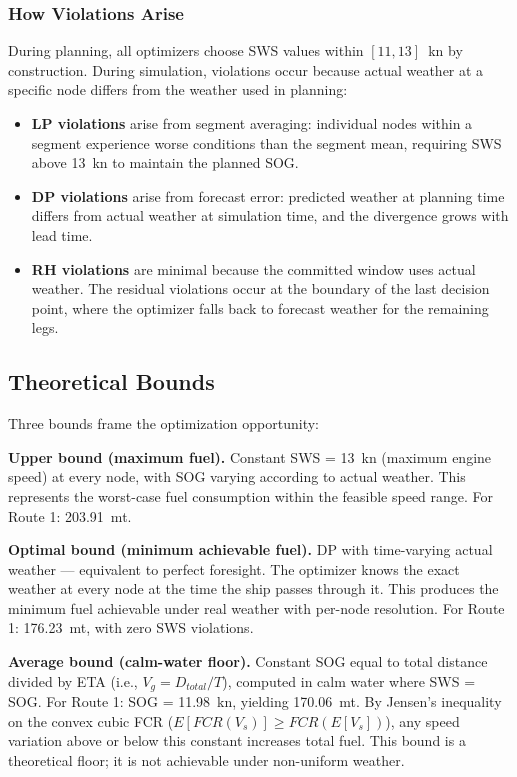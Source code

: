 \documentclass[review]{elsarticle}
\begin{document}
\subsubsection{How Violations Arise}

During planning, all optimizers choose SWS values within $[11, 13]$~kn by construction. During simulation, violations occur because actual weather at a specific node differs from the weather used in planning:

\begin{itemize}
    \item \textbf{LP violations} arise from segment averaging: individual nodes within a segment experience worse conditions than the segment mean, requiring SWS above 13~kn to maintain the planned SOG.
    \item \textbf{DP violations} arise from forecast error: predicted weather at planning time differs from actual weather at simulation time, and the divergence grows with lead time.
    \item \textbf{RH violations} are minimal because the committed window uses actual weather. The residual violations occur at the boundary of the last decision point, where the optimizer falls back to forecast weather for the remaining legs.
\end{itemize}

\subsection{Theoretical Bounds}
\label{sec:bounds}

Three bounds frame the optimization opportunity:

\textbf{Upper bound (maximum fuel).} Constant SWS = 13~kn (maximum engine speed) at every node, with SOG varying according to actual weather. This represents the worst-case fuel consumption within the feasible speed range. For Route 1: 203.91~mt.

\textbf{Optimal bound (minimum achievable fuel).} DP with time-varying actual weather --- equivalent to perfect foresight. The optimizer knows the exact weather at every node at the time the ship passes through it. This produces the minimum fuel achievable under real weather with per-node resolution. For Route 1: 176.23~mt, with zero SWS violations.

\textbf{Average bound (calm-water floor).} Constant SOG equal to total distance divided by ETA (i.e., $V_g = D_{total} / T$), computed in calm water where SWS = SOG. For Route 1: SOG = 11.98~kn, yielding 170.06~mt. By Jensen's inequality on the convex cubic FCR ($E[FCR(V_s)] \geq FCR(E[V_s])$), any speed variation above or below this constant increases total fuel. This bound is a theoretical floor; it is not achievable under non-uniform weather.
\end{document}
